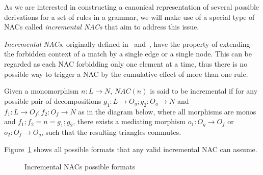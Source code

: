 As we are interested in constructing a canonical representation of several possible derivations for a set of rules in a grammar, we will make use of a special type of NACs called \emph{incremental NACs} that aim to address this issue.

\emph{Incremental NACs}, originally defined in~\cite{Corradini2013} and~\cite{Corradini2014}, have the property of extending the forbidden context of a match by a single edge or a single node. This can be regarded as each NAC forbidding only one element at a time, thus there is no possible way to trigger a NAC by the cumulative effect of more than one rule.


\begin{definition} Given a monomorphism \mbox{$n : L \rightarrow N$}, $NAC(n)$ is said to be incremental if for any possible pair of decompositions \mbox{$g_1 : L \rightarrow O_g;g_2 : O_g \rightarrow N$} and \mbox{$f_1 : L \rightarrow O_f;f_2 : O_f \rightarrow N$} as in the diagram below, where all morphisms are monos and \mbox{$f_1;f_2 = n = g_1;g_2$}, there exists a mediating morphism $o_1 : O_g \rightarrow O_f$ or $o_2 : O_f \rightarrow O_g$, such that the resulting triangles
  commutes.


\end{definition}

\begin{example}Figure~\ref{fig:process:incremental-nacs} shows all possible formats that any valid incremental NAC can assume.

\begin{figure}[!ht]
  \centering
  \caption{Incremental NACs possible formats}\label{fig:process:incremental-nacs}
\end{figure}
\end{example}

